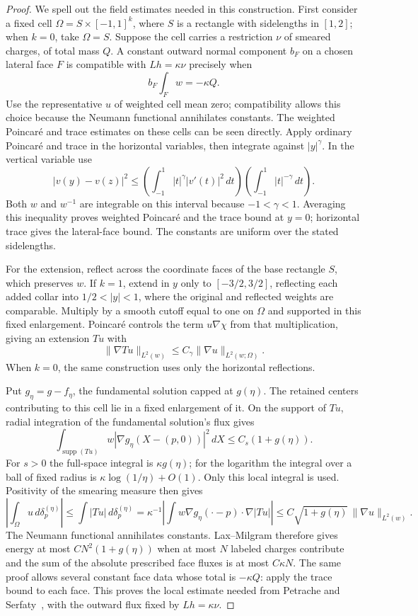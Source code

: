 \begin{proof}
We spell out the field estimates needed in this construction.
First consider a fixed cell $\Omega=S\times[-1,1]^k$, where $S$ is a
rectangle with sidelengths in $[1,2]$; when $k=0$, take $\Omega=S$.
Suppose the cell carries a restriction $\nu$ of smeared charges, of total
mass $Q$. A constant outward normal component $b_F$ on a chosen lateral
face $F$ is compatible with $Lh=\kappa\nu$ precisely when
\[
                 b_F\int_Fw=-\kappa Q.
\]
Use the representative $u$ of weighted cell mean zero; compatibility
allows this choice because the Neumann functional annihilates constants.
The weighted Poincar\'e and trace estimates on these cells can be seen
directly. Apply ordinary Poincar\'e and trace in the horizontal variables,
then integrate against $|y|^\gamma$. In the vertical variable use
\[
 |v(y)-v(z)|^2
 \le\left(\int_{-1}^1|t|^\gamma|v'(t)|^2\,dt\right)
     \left(\int_{-1}^1|t|^{-\gamma}\,dt\right).
\]
Both $w$ and $w^{-1}$ are integrable on this interval because
$-1<\gamma<1$. Averaging this inequality proves weighted Poincar\'e
and the trace bound at $y=0$; horizontal trace gives the lateral-face
bound. The constants are uniform over the stated sidelengths.

For the extension, reflect across the coordinate faces of the base rectangle $S$, which
preserves $w$. If $k=1$, extend in $y$ only to $[-3/2,3/2]$, reflecting
each added collar into $1/2<|y|<1$, where the original and reflected
weights are comparable. Multiply by a smooth cutoff equal to one on
$\Omega$ and supported in this fixed enlargement. Poincar\'e controls
the term $u\nabla\chi$ from that multiplication, giving an extension
$Tu$ with
\[
 \|\nabla Tu\|_{L^2(w)}
       \le C_\gamma\|\nabla u\|_{L^2(w;\Omega)}.
\]
When $k=0$, the same construction uses only the horizontal reflections.

Put $g_\eta=g-f_\eta$, the fundamental solution capped at $g(\eta)$.
The retained centers contributing to this cell lie in a fixed enlargement
of it. On the support of $Tu$, radial integration of the fundamental
solution's flux gives
\[
 \int_{\operatorname{supp}(Tu)}w
                  |\nabla g_\eta(X-(p,0))|^2\,dX
       \le C_s(1+g(\eta)).
\]
For $s>0$ the full-space integral is $\kappa g(\eta)$; for the
logarithm the integral over a ball of fixed radius is
$\kappa\log(1/\eta)+O(1)$. Only this local integral is used.
Positivity of the smearing measure then gives
\[
 \left|\int_\Omega u\,d\delta_p^{(\eta)}\right|
 \le\int |Tu|\,d\delta_p^{(\eta)}
 =\kappa^{-1}\left|\int w\nabla g_\eta(\cdot-p)
                                      \cdot\nabla|Tu|\right|
 \le C\sqrt{1+g(\eta)}\,\|\nabla u\|_{L^2(w)}.
\]
The Neumann functional annihilates constants.  Lax--Milgram therefore
gives energy at most $C N^2(1+g(\eta))$ when at most $N$ labeled
charges contribute and the sum of the absolute prescribed face fluxes
is at most $C\kappa N$.  The same proof allows several constant face
data whose total is $-\kappa Q$: apply the trace bound to each face.
This proves the local estimate needed from
Petrache and Serfaty~\citep[Lemma~6.6]{PetracheSerfaty2017}, with the outward flux fixed by
$Lh=\kappa\nu$.


\end{proof}
